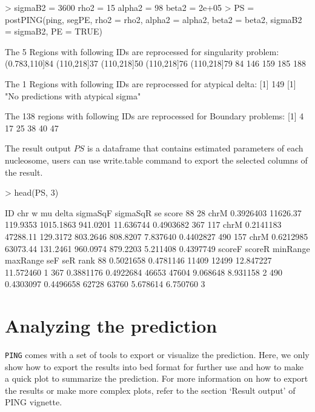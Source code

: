 \documentclass[11pt]{article}
\begin{document}
\begin{Schunk}
\begin{Sinput}
> {
     sigmaB2 = 3600
     rho2 = 15
     alpha2 = 98
     beta2 = 2e+05
 }
> PS = postPING(ping, segPE, rho2 = rho2, alpha2 = alpha2, beta2 = beta2, 
     sigmaB2 = sigmaB2, PE = TRUE)
\end{Sinput}
\begin{Soutput}
 The 5 Regions with following IDs are reprocessed for singularity problem: 
(0.783,110]84   (110,218]37   (110,218]50   (110,218]76   (110,218]79 
           84           146           159           185           188 

 The 1 Regions with following IDs are reprocessed for atypical delta: 
[1] 149
[1] "No predictions with atypical sigma"

 The 138 regions with following IDs are reprocessed for Boundary problems: 
[1]  4 17 25 38 40 47
\end{Soutput}
\end{Schunk}
The result output $PS$ is a dataframe that contains estimated parameters of each nucleosome, users can use write.table command to export the selected columns of the result.
\begin{Schunk}
\begin{Sinput}
> head(PS, 3)
\end{Sinput}
\begin{Soutput}
     ID  chr         w       mu    delta  sigmaSqF sigmaSqR        se     score
88   28 chrM 0.3926403 11626.37 119.9353 1015.1863 941.0201 11.636744 0.4903682
367 117 chrM 0.2141183 47288.11 129.3172  803.2646 808.8207  7.837640 0.4402827
490 157 chrM 0.6212985 63073.44 131.2461  960.0974 879.2203  5.211408 0.4397749
       scoreF    scoreR minRange maxRange       seF       seR rank
88  0.5021658 0.4781146    11409    12499 12.847227 11.572460    1
367 0.3881176 0.4922684    46653    47604  9.068648  8.931158    2
490 0.4303097 0.4496658    62728    63760  5.678614  6.750760    3
\end{Soutput}
\end{Schunk}

\section{Analyzing the prediction}
\texttt{PING} comes with a set of tools to export or visualize the prediction.
Here, we only show how to export the results into bed format for further use
and how to make a quick plot to summarize the prediction. For more information
on how to export the results or make more complex plots, refer to the section
`Result output' of PING vignette.
\end{document}
